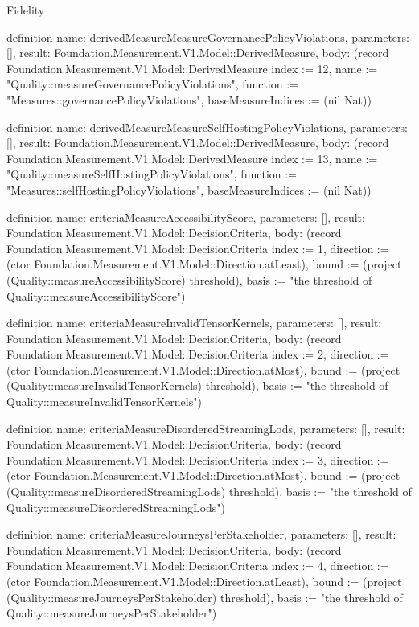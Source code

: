 \begin{lexlean}{Fidelity}
\begin{semanticmodule}
definition{
  name: derivedMeasureMeasureGovernancePolicyViolations,
  parameters: [],
  result: Foundation.Measurement.V1.Model::DerivedMeasure,
  body: (record Foundation.Measurement.V1.Model::DerivedMeasure {index := 12, name := "Quality::measureGovernancePolicyViolations", function := "Measures::governancePolicyViolations", baseMeasureIndices := (nil Nat)})
}

definition{
  name: derivedMeasureMeasureSelfHostingPolicyViolations,
  parameters: [],
  result: Foundation.Measurement.V1.Model::DerivedMeasure,
  body: (record Foundation.Measurement.V1.Model::DerivedMeasure {index := 13, name := "Quality::measureSelfHostingPolicyViolations", function := "Measures::selfHostingPolicyViolations", baseMeasureIndices := (nil Nat)})
}

definition{
  name: criteriaMeasureAccessibilityScore,
  parameters: [],
  result: Foundation.Measurement.V1.Model::DecisionCriteria,
  body: (record Foundation.Measurement.V1.Model::DecisionCriteria {index := 1, direction := (ctor Foundation.Measurement.V1.Model::Direction.atLeast), bound := (project (Quality::measureAccessibilityScore) threshold), basis := "the threshold of Quality::measureAccessibilityScore"})
}

definition{
  name: criteriaMeasureInvalidTensorKernels,
  parameters: [],
  result: Foundation.Measurement.V1.Model::DecisionCriteria,
  body: (record Foundation.Measurement.V1.Model::DecisionCriteria {index := 2, direction := (ctor Foundation.Measurement.V1.Model::Direction.atMost), bound := (project (Quality::measureInvalidTensorKernels) threshold), basis := "the threshold of Quality::measureInvalidTensorKernels"})
}

definition{
  name: criteriaMeasureDisorderedStreamingLods,
  parameters: [],
  result: Foundation.Measurement.V1.Model::DecisionCriteria,
  body: (record Foundation.Measurement.V1.Model::DecisionCriteria {index := 3, direction := (ctor Foundation.Measurement.V1.Model::Direction.atMost), bound := (project (Quality::measureDisorderedStreamingLods) threshold), basis := "the threshold of Quality::measureDisorderedStreamingLods"})
}

definition{
  name: criteriaMeasureJourneysPerStakeholder,
  parameters: [],
  result: Foundation.Measurement.V1.Model::DecisionCriteria,
  body: (record Foundation.Measurement.V1.Model::DecisionCriteria {index := 4, direction := (ctor Foundation.Measurement.V1.Model::Direction.atLeast), bound := (project (Quality::measureJourneysPerStakeholder) threshold), basis := "the threshold of Quality::measureJourneysPerStakeholder"})
}


\end{semanticmodule}
\end{lexlean}
